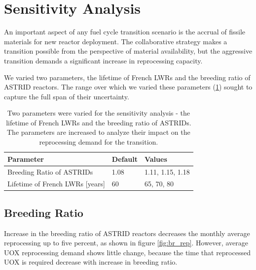 \section{Sensitivity Analysis}

An important aspect of any fuel cycle transition scenario
is the accrual of fissile materials for new reactor deployment.
The collaborative strategy makes a transition possible 
from the perspective of material availability,
but the aggressive transition demands a significant increase in reprocessing capacity.

We varied two parameters, the lifetime of French \glspl{LWR} and the
breeding ratio of \gls{ASTRID} reactors. The range over which we varied these parameters (\cref{tab:sen_par})
sought to capture the full span of their uncertainty.

\begin{table}[h]
    \centering
    \begin{tabularx}{\textwidth}{lbb}
        \hline
        \textbf{Parameter} & \textbf{Default} & \textbf{Values} \\
        \hline
        Breeding Ratio of \glspl{ASTRID} & 1.08 & 1.11, 1.15, 1.18 \\ 
        Lifetime of French \glspl{LWR} [years] & 60  & 65, 70, 80 \\
        \hline
    \end{tabularx}
    \caption {Two parameters were varied for the sensitivity analysis - the 
              lifetime of French \glspl{LWR} and the breeding ratio of \glspl{ASTRID}.
              The parameters are increased to analyze their impact on the reprocessing
              demand for the transition.}
    \label{tab:sen_par}
\end{table}

\subsection{Breeding Ratio}

Increase in the breeding ratio of \gls{ASTRID} reactors
decreases the monthly average reprocessing up to five percent,
as shown in figure \ref{fig:br_rep}.
However, average \gls{UOX} reprocessing demand shows little change,
because the time that reprocessed \gls{UOX} is required decrease with
increase in breeding ratio. 

